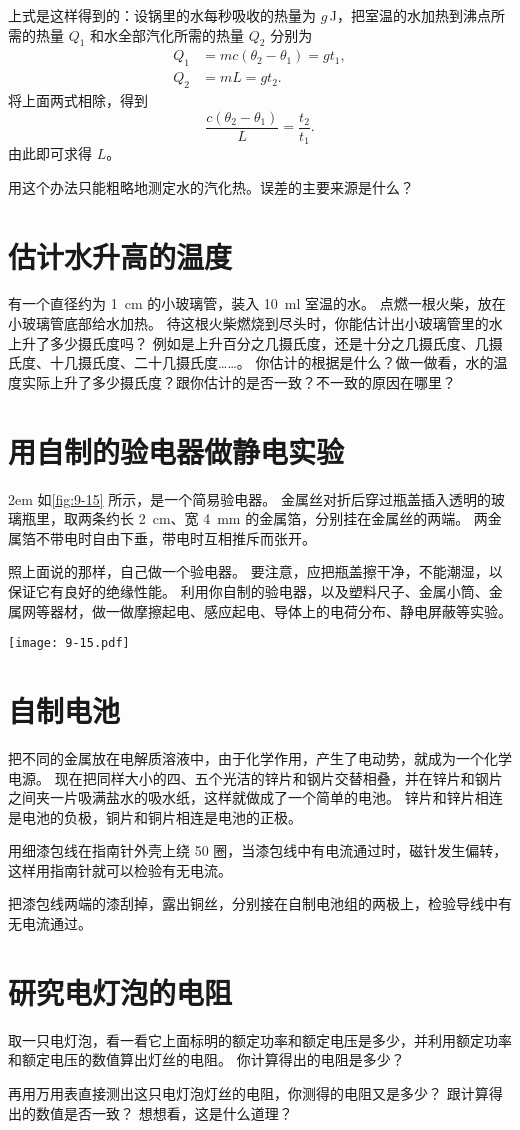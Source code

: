 上式是这样得到的：设锅里的水每秒吸收的热量为 $g$\,\unit{J}，把室温的水加热到沸点所需的热量 $Q_1$ 和水全部汽化所需的热量 $Q_2$ 分别为
\[\begin{split}
    Q_1&=mc(\theta_2-\theta_1)=gt_1,\\
    Q_2&=mL=gt_2.
\end{split}\]
将上面两式相除，得到
\[\frac{c(\theta_2-\theta_1)}{L}=\frac{t_2}{t_1}.\]
由此即可求得 $L$。

用这个办法只能粗略地测定水的汽化热。误差的主要来源是什么？

\section{估计水升高的温度}
有一个直径约为 \qty{1}{cm} 的小玻璃管，装入 \qty{10}{ml} 室温的水。
点燃一根火柴，放在小玻璃管底部给水加热。
待这根火柴燃烧到尽头时，你能估计出小玻璃管里的水上升了多少摄氏度吗？
例如是上升百分之几摄氏度，还是十分之几摄氏度、几摄氏度、十几摄氏度、二十几摄氏度……。
你估计的根据是什么？做一做看，水的温度实际上升了多少摄氏度？跟你估计的是否一致？不一致的原因在哪里？

\section{用自制的验电器做静电实验}
\medskip\noindent
\begin{minipage}{0.65\linewidth}\parindent2em
  如\cref{fig:9-15} 所示，是一个简易验电器。
  金属丝对折后穿过瓶盖插入透明的玻璃瓶里，取两条约长 \qty{2}{cm}、宽 \qty{4}{mm} 的金属箔，分别挂在金属丝的两端。
  两金属箔不带电时自由下垂，带电时互相推斥而张开。

  照上面说的那样，自己做一个验电器。
  要注意，应把瓶盖擦干净，不能潮湿，以保证它有良好的绝缘性能。
  利用你自制的验电器，以及塑料尺子、金属小筒、金属网等器材，做一做摩擦起电、感应起电、导体上的电荷分布、静电屏蔽等实验。
\end{minipage}\hfill
\begin{minipage}{0.3\linewidth}\centering
  \begin{figurehere}
    \texttt{[image: 9-15.pdf]}
    \caption{}\label{fig:9-15}
  \end{figurehere}
\end{minipage}

\section{自制电池}
把不同的金属放在电解质溶液中，由于化学作用，产生了电动势，就成为一个化学电源。
现在把同样大小的四、五个光洁的锌片和钢片交替相叠，并在锌片和钢片之间夹一片吸满盐水的吸水纸，这样就做成了一个简单的电池。
锌片和锌片相连是电池的负极，铜片和铜片相连是电池的正极。

用细漆包线在指南针外壳上绕 50 圈，当漆包线中有电流通过时，磁针发生偏转，这样用指南针就可以检验有无电流。

把漆包线两端的漆刮掉，露出铜丝，分别接在自制电池组的两极上，检验导线中有无电流通过。

\section{研究电灯泡的电阻}
取一只电灯泡，看一看它上面标明的额定功率和额定电压是多少，并利用额定功率和额定电压的数值算出灯丝的电阻。
你计算得出的电阻是多少？

再用万用表直接测出这只电灯泡灯丝的电阻，你测得的电阻又是多少？
跟计算得出的数值是否一致？
想想看，这是什么道理？